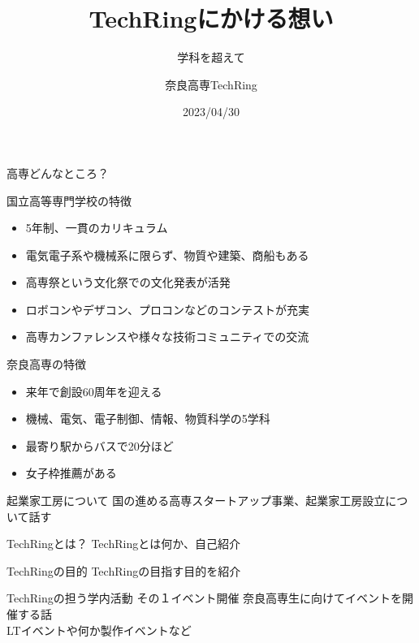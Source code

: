 \documentclass[dvipdfmx]{beamer}
\title{TechRingにかける想い}
\subtitle{学科を超えて}
\author[TechRing]{奈良高専TechRing}
\date[2023/04/30]{2023/04/30}
\begin{document}
\maketitle

\begin{frame}{高専どんなところ？}

  \begin{large}
    国立高等専門学校の特徴
  \end{large}
  \begin{itemize}
    \setlength{\itemsep}{2mm}
    \item 5年制、一貫のカリキュラム
    \item 電気電子系や機械系に限らず、物質や建築、商船もある
    \item 高専祭という文化祭での文化発表が活発
    \item ロボコンやデザコン、プロコンなどのコンテストが充実
    \item 高専カンファレンスや様々な技術コミュニティでの交流
  \end{itemize}

  \vspace{3mm}
  \begin{large}
    奈良高専の特徴
  \end{large}
  \begin{itemize}
    \setlength{\itemsep}{2mm}
    \item 来年で創設60周年を迎える
    \item 機械、電気、電子制御、情報、物質科学の5学科
    \item 最寄り駅からバスで20分ほど
    \item 女子枠推薦がある
  \end{itemize}
\end{frame}

\begin{frame}{起業家工房について}
  国の進める高専スタートアップ事業、起業家工房設立について話す
\end{frame}

\begin{frame}{TechRingとは？}
  TechRingとは何か、自己紹介
\end{frame}

\begin{frame}{TechRingの目的}
  TechRingの目指す目的を紹介
\end{frame}

\begin{frame}{TechRingの担う学内活動 その１}{イベント開催}
  奈良高専生に向けてイベントを開催する話\\
  LTイベントや何か製作イベントなど
\end{frame}
\end{document}
